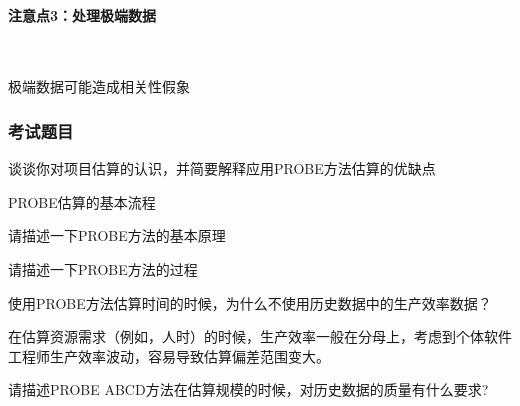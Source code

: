 

\paragraph{注意点3：处理极端数据}~{} \par
极端数据可能造成相关性假象

\subsubsection{考试题目}
\begin{problem}
谈谈你对项目估算的认识，并简要解释应用PROBE方法估算的优缺点
\end{problem}

\begin{problem}
PROBE估算的基本流程
\end{problem}

\begin{problem}
请描述一下PROBE方法的基本原理
\end{problem}

\begin{problem}
请描述一下PROBE方法的过程
\end{problem}

\begin{problem}
使用PROBE方法估算时间的时候，为什么不使用历史数据中的生产效率数据？

在估算资源需求（例如，人时）的时候，生产效率一般在分母上，考虑到个体软件工程师生产效率波动，容易导致估算偏差范围变大。
\end{problem}

\begin{problem}
请描述PROBE ABCD方法在估算规模的时候，对历史数据的质量有什么要求? 
\end{problem}

